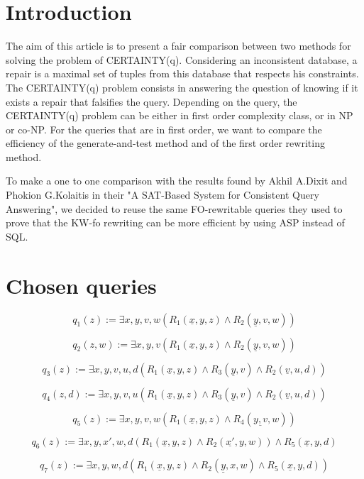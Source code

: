 
\section{Introduction}
The aim of this article is to present a fair comparison between two methods for
solving the problem of CERTAINTY(q). Considering an inconsistent database, a
repair is a maximal set of tuples from this database that respects his
constraints. The CERTAINTY(q) problem consists in answering the question of
knowing if it exists a repair that falsifies the query. Depending on the query,
the CERTAINTY(q) problem can be either in first order complexity class, or in
NP or co-NP. For the queries that are in first order, we want to compare the
efficiency of the generate-and-test method and of the first order rewriting
method.

To make a one to one comparison with the results found by Akhil A.Dixit and
Phokion G.Kolaitis in their "A SAT-Based System for Consistent Query
Answering", we decided to reuse the same FO-rewritable queries they used to prove that the KW-fo rewriting can be more efficient by using ASP instead of SQL.


\section{Chosen queries}

$$q_1(z) := \exists x, y, v, w (R_1(\underline{x},y,z) \wedge R_2(\underline{y}, v, w)) $$

$$q_2(z,w) :=  \exists x, y, v (R_1(\underline{x},y,z) \wedge R_2(\underline{y}, v, w)) $$

$$q_3(z) :=  \exists x, y, v, u, d (R_1(\underline{x},y,z) \wedge R_3(\underline{y}, v) \wedge R_2(\underline{v}, u,d)) $$

$$q_4(z,d) :=  \exists x, y, v, u (R_1(\underline{x},y,z) \wedge R_3(\underline{y}, v)\wedge R_2(\underline{v}, u, d)) $$

$$q_5(z) := \exists x, y, v, w (R_1(\underline{x},y,z) \wedge R_4(\underline{y, v},w)) $$

$$q_6(z) := \exists x, y, x', w, d (R_1(\underline{x},y,z) \wedge R_2(\underline{x'},y,w))
\wedge R_5(\underline{x},y,d) $$

$$q_7(z) := \exists x, y, w, d (R_1(\underline{x},y,z) \wedge R_2(\underline{y},x,w) \wedge R_5(\underline{x},y,d)) $$

